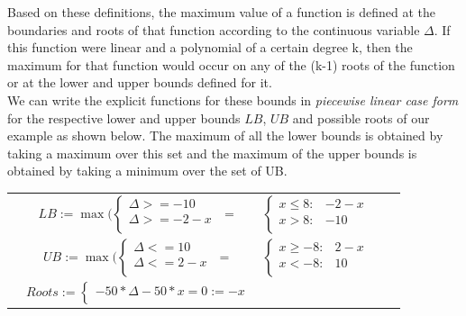\documentclass[letterpaper]{article}
\begin{document}
Based on these definitions, the maximum value of a function is defined at the boundaries and roots of that function according to the continuous variable $\Delta$. If this function were linear and a polynomial of a certain degree k, then the maximum for that function would occur on any of the (k-1) roots of the function or at the lower and upper bounds defined for it.
\\We can write the explicit functions for these bounds in  \emph{piecewise linear case form} for the respective lower and upper bounds $LB$, $UB$ and possible roots of our example as shown below. The maximum of all the lower bounds is obtained by taking a maximum over this set and the maximum of the upper bounds is obtained by taking a minimum over the set of UB.

{\footnotesize
\begin{center}
\begin{tabular}{r c c c l}
&
\hspace{-9mm} $LB:= \max \Bigg(
  \begin{cases}
\Delta >= -10 \\ 
\Delta >= -2 -x\\ 
  \end{cases}$
$=$
&
\hspace{-4mm}
$  \begin{cases}
x \leq 8: & -2 -x \\ 
x > 8: &-10\\ 
  \end{cases}$
&
\hspace{-4mm} 
\\
&
\hspace{-4mm}
$UB:= \max \Bigg(
  \begin{cases}
\Delta <= 10 \\ 
\Delta <= 2 -x\\ 
  \end{cases}$
$=$
&
\hspace{-4mm}
$  \begin{cases}
x \geq -8: & 2 -x \\ 
x < -8: &10\\ 
  \end{cases}$
&
\hspace{-4mm} 
\\
&
\hspace{-4mm}
$Roots:= 
  \begin{cases}
- 50* \Delta -50*x =0 := -x \\ 

  \end{cases}$
\end{tabular}
\end{center}
}
\end{document}
